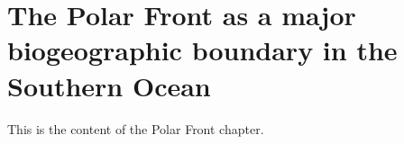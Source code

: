 \chapter{The Polar Front as a major biogeographic boundary in the Southern Ocean} 
\label{ch:polarfront}

This is the content of the Polar Front chapter.
